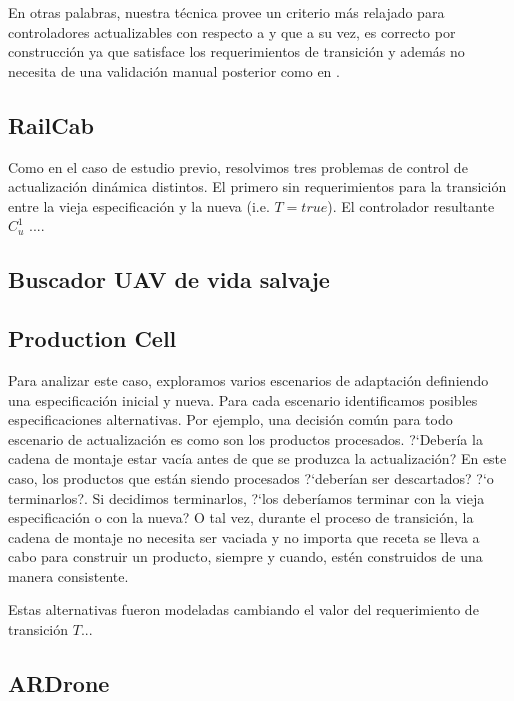 En otras palabras, nuestra técnica provee un criterio más relajado para controladores actualizables con respecto a
\cite{6224401} y que a su vez, es correcto por construcción ya que satisface los requerimientos de transición y además
no necesita de una validación manual posterior como en \cite{PanzicaLaManna:2013:FCC:2487336.2487349}.


\subsection{RailCab}

Como en el caso de estudio previo, resolvimos tres problemas de control de actualización dinámica distintos. El primero
sin requerimientos para la transición entre la vieja especificación y la nueva (i.e. $T = true$). El controlador
resultante $C^1_u$ ....

\subsection{Buscador UAV de vida salvaje}

\subsection{Production Cell}

Para analizar este caso, exploramos varios escenarios de adaptación definiendo una especificación inicial y nueva. Para
cada escenario identificamos posibles especificaciones alternativas. Por ejemplo, una decisión común para todo escenario
de actualización es como son los productos procesados. ?`Debería la cadena de montaje estar vacía antes de que se
produzca la actualización? En este caso, los productos que están siendo procesados ?`deberían ser descartados? ?`o
terminarlos?. Si decidimos terminarlos, ?`los deberíamos terminar con la vieja especificación o con la nueva? O tal vez,
durante el proceso de transición, la cadena de montaje no necesita ser vaciada y no importa que receta se lleva a cabo
para  construir un producto, siempre y cuando, estén construidos de una manera consistente. 

Estas alternativas fueron modeladas cambiando el valor del requerimiento de transición $T$...

\subsection{ARDrone}

